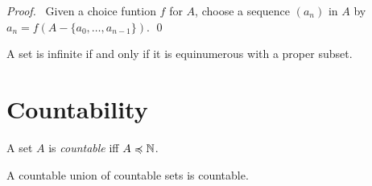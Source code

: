 \begin{proof}
    \pf\ Given a choice funtion $f$ for $A$, choose a sequence $(a_n)$ in $A$
    by $a_n = f(A - \{ a_0, \ldots, a_{n-1} \})$. \qed
\end{proof}

\begin{corollary}[AC]
    A set is infinite if and only if it is equinumerous with a proper subset.
\end{corollary}

\section{Countability}

\begin{definition}[Countable]
    A set $A$ is \emph{countable} iff $A \preccurlyeq \mathbb{N}$.
\end{definition}

\begin{theorem}[AC]
    A countable union of countable sets is countable.
\end{theorem}